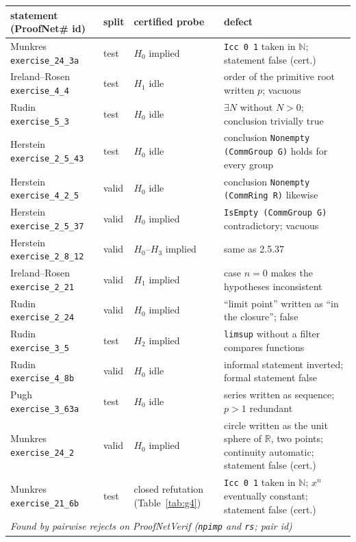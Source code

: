 \documentclass[10pt]{article}
\theoremstyle{definition}
\begin{document}
\begin{table}[h]
\centering\footnotesize
\begin{tabular}{lllp{6.2cm}}
\toprule
statement (ProofNet\# id) & split & certified probe & defect\\
\midrule
Munkres \texttt{exercise\_24\_3a} & test & $H_0$ implied & \texttt{Icc 0 1} taken in $\mathbb N$; statement false (cert.)\\
Ireland--Rosen \texttt{exercise\_4\_4} & test & $H_1$ idle & order of the primitive root written $p$; vacuous\\
Rudin \texttt{exercise\_5\_3} & test & $H_0$ idle & $\exists N$ without $N>0$; conclusion trivially true\\
Herstein \texttt{exercise\_2\_5\_43} & test & $H_0$ idle & conclusion \texttt{Nonempty (CommGroup G)} holds for every group\\
Herstein \texttt{exercise\_4\_2\_5} & valid & $H_0$ idle & conclusion \texttt{Nonempty (CommRing R)} likewise\\
Herstein \texttt{exercise\_2\_5\_37} & valid & $H_0$ implied & \texttt{IsEmpty (CommGroup G)} contradictory; vacuous\\
Herstein \texttt{exercise\_2\_8\_12} & valid & $H_0$--$H_3$ implied & same as 2.5.37\\
Ireland--Rosen \texttt{exercise\_2\_21} & valid & $H_1$ implied & case $n=0$ makes the hypotheses inconsistent\\
Rudin \texttt{exercise\_2\_24} & valid & $H_0$ implied & ``limit point'' written as ``in the closure''; false\\
Rudin \texttt{exercise\_3\_5} & test & $H_2$ implied & \texttt{limsup} without a filter compares functions\\
Rudin \texttt{exercise\_4\_8b} & valid & $H_0$ idle & informal statement inverted; formal statement false\\
Pugh \texttt{exercise\_3\_63a} & test & $H_0$ idle & series written as sequence; $p>1$ redundant\\
Munkres \texttt{exercise\_24\_2} & valid & $H_0$ implied & circle written as the unit sphere of $\mathbb R$, two points; continuity automatic; statement false (cert.)\\
Munkres \texttt{exercise\_21\_6b} & test & closed refutation (Table~\ref{tab:g4}) & \texttt{Icc 0 1} taken in $\mathbb N$; $x^n$ eventually constant; statement false (cert.)\\
\midrule
\multicolumn{4}{l}{\emph{Found by pairwise rejects on ProofNetVerif (\texttt{npimp} and \texttt{rs}; pair id)}}\\

\end{tabular}
\end{table}
\end{document}
